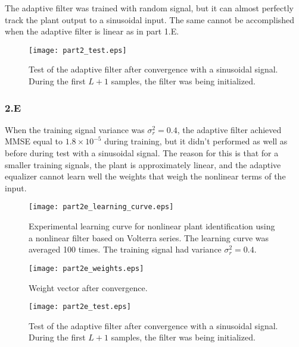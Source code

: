 The adaptive filter was trained with random signal, but it can almost perfectly track the plant output to a sinusoidal input. The same cannot be accomplished when the adaptive filter is linear as in part 1.E.

\FloatBarrier
\begin{figure}[h!]
	\centering
	\texttt{[image: part2\_test.eps]}
	\caption{Test of the adaptive filter after convergence with a sinusoidal signal. During the first $L+1$ samples, the filter was being initialized.}
	\label{fig:part2-test}
\end{figure}
\FloatBarrier

\subsubsection*{2.E}

When the training signal variance was $\sigma_r^2 = 0.4$, the adaptive filter achieved MMSE equal to $1.8\times 10^{-5}$ during training, but it didn't performed as well as before during test with a sinusoidal signal. The reason for this is that for a smaller training signals, the plant is approximately linear, and the adaptive equalizer cannot learn well the weights that weigh the nonlinear terms of the input. 

\FloatBarrier
\begin{figure}[h!]
	\centering
	\texttt{[image: part2e\_learning\_curve.eps]}
	\caption{Experimental learning curve for nonlinear plant identification using a nonlinear filter based on Volterra series. The learning curve was averaged 100 times. The training signal had variance $\sigma_r^2 = 0.4$.}
	\label{fig:part2e-learning-curve}
\end{figure}
\FloatBarrier

\FloatBarrier
\begin{figure}[h!]
	\centering
	\texttt{[image: part2e\_weights.eps]}
	\caption{Weight vector after convergence.}
	\label{fig:part2e-weights}
\end{figure}
\FloatBarrier

\FloatBarrier
\begin{figure}[t!]
	\centering
	\texttt{[image: part2e\_test.eps]}
	\caption{Test of the adaptive filter after convergence with a sinusoidal signal. During the first $L+1$ samples, the filter was being initialized.}
	\label{fig:part2e-test}
\end{figure}
\FloatBarrier
